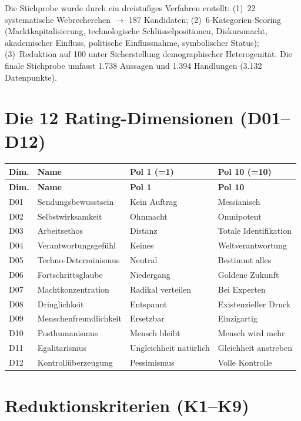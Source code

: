 \documentclass[12pt,a4paper]{article}
\begin{document}
Die Stichprobe wurde durch ein dreistufiges Verfahren erstellt: (1)~22 systematische Webrecherchen $\to$ 187 Kandidaten; (2)~6-Kategorien-Scoring (Marktkapitalisierung, technologische Schl\"usselpositionen, Diskursmacht, akademischer Einfluss, politische Einflussnahme, symbolischer Status); (3)~Reduktion auf 100 unter Sicherstellung demographischer Heterogenit\"at. Die finale Stichprobe umfasst 1.738 Aussagen und 1.394 Handlungen (3.132 Datenpunkte).


\section{Die 12 Rating-Dimensionen (D01--D12)}
\label{app:dimensionen}

\begin{longtable}{l l l l}
  \toprule
  \textbf{Dim.} & \textbf{Name} & \textbf{Pol 1 (=1)} & \textbf{Pol 10 (=10)} \\
  \midrule
  \endfirsthead
  \toprule
  \textbf{Dim.} & \textbf{Name} & \textbf{Pol 1} & \textbf{Pol 10} \\
  \midrule
  \endhead
  D01 & Sendungsbewusstsein & Kein Auftrag & Messianisch \\
  D02 & Selbstwirksamkeit & Ohnmacht & Omnipotent \\
  D03 & Arbeitsethos & Distanz & Totale Identifikation \\
  D04 & Verantwortungsgef\"uhl & Keines & Weltverantwortung \\
  D05 & Techno-Determinismus & Neutral & Bestimmt alles \\
  D06 & Fortschrittsglaube & Niedergang & Goldene Zukunft \\
  D07 & Machtkonzentration & Radikal verteilen & Bei Experten \\
  D08 & Dringlichkeit & Entspannt & Existenzieller Druck \\
  D09 & Menschenfreundlichkeit & Ersetzbar & Einzigartig \\
  D10 & Posthumanismus & Mensch bleibt & Mensch wird mehr \\
  D11 & Egalitarismus & Ungleichheit nat\"urlich & Gleichheit anstreben \\
  D12 & Kontroll\"uberzeugung & Pessimismus & Volle Kontrolle \\
  \bottomrule
\end{longtable}


\section{Reduktionskriterien (K1--K9)}
\label{app:reduktion}
\end{document}
